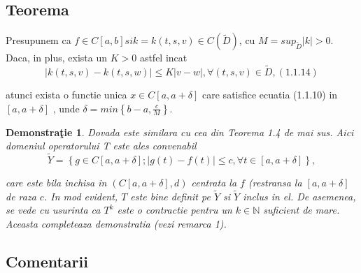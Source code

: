 \documentclass[a4paper,12pt,oneside]{report}
\newtheorem{demonstration}{Demonstra\c tie}
\begin{document}
	\subsection{Teorema}
					
	Presupunem ca \(f \in C \left [ a,b \right ] si k = k\left ( t,s,v \right ) \in C\left ( \tilde{D} \right )\), cu \(M = sup _{\tilde{D}}\left | k \right |> 0\). Daca, in plus, exista un \(K > 0\) astfel incat 
	\begin{displaymath}
		\left | k\left ( t,s,v \right ) - k \left ( t,s,w \right ) \right | \leq K \left | v-w \right |, \forall \left ( t,s,v \right ) \in \tilde{D}, (1.1.14)
	\end{displaymath}
					
	atunci exista o functie unica \(x \in C \left [ a, a + \delta  \right ]\) care satisfice ecuatia (1.1.10)  in  \(\left [ a, a + \delta  \right ]\) , unde \(\delta = min \left \{ b-a, \frac{c}{M} \right \}\). 
					
	\begin{demonstration}
										
		Dovada este similara cu cea din Teorema 1.4 de mai sus. Aici domeniul operatorului T este ales convenabil 
		\begin{displaymath}
			\tilde{Y} = \left \{ g \in C \left [ a, a+ \delta  \right ] ; \left | g\left ( t \right ) - f\left ( t \right ) \right | \leq c, \forall t \in \left [ a, a+ \delta  \right ] \right \}, 
		\end{displaymath}
										
		care este bila inchisa in \(\left ( C\left [ a, a+ \delta  \right ], d \right )\) centrata la \(f\) (restransa la \(\left [ a, a+ \delta  \right ]\) de raza \(c\). In mod evident, \(T\) este bine definit pe \(\tilde{Y}\) si \(\tilde{Y}\) inclus in el. De asemenea, se vede cu usurinta ca \(T^{k}\) este o contractie pentru un \(k \in \mathbb{N}\)  suficient de mare. Aceasta completeaza demonstratia (vezi remarca 1).   
										
	\end{demonstration}
					
	\subsection{Comentarii}
					
\end{document}
